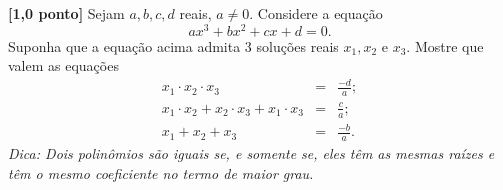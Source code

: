 {\bf [1,0 ponto]} Sejam $a,b,c,d$ reais, $a\not=0$.
Considere a equação
\[
	ax^3+bx^2+cx+d=0.
\]
Suponha que a equação acima admita 3 soluções reais $x_1,x_2$ e $x_3$.
Mostre que valem as equações
\begin{eqnarray*}
	x_1\cdot x_2\cdot x_3 & = & \frac{-d}{a};\\
	x_1\cdot x_2+x_2\cdot x_3+x_1\cdot x_3 & = & \frac{c}{a};\\
	x_1+x_2+x_3 & = & \frac{-b}{a}.
\end{eqnarray*}
{\it Dica: Dois polinômios são iguais se, e somente se, eles têm as mesmas raízes e têm o mesmo coeficiente
no termo de maior grau.}
